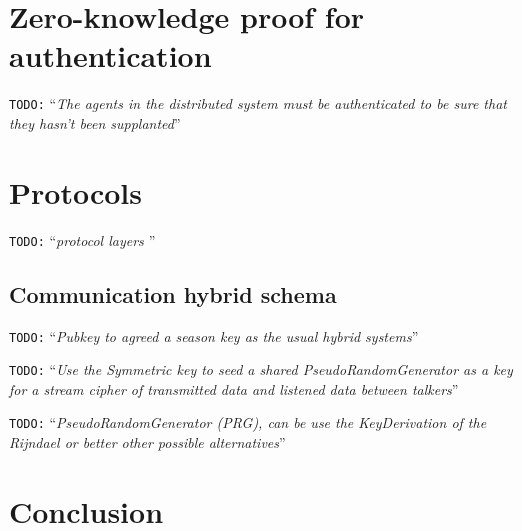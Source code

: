 \documentclass[10pt,a4paper,twoside]{llncs}
\newcommand{\todo}[1]{\texttt{\color{red}TODO:} ``\emph{#1}''}
\begin{document}
%
\section{Zero-knowledge proof for authentication \label{sec:auth}}

\todo{The agents in the distributed system must be authenticated to be sure that they hasn't been supplanted}

%
\section{Protocols}

\todo{protocol layers \cite{Schneier:1995:ACP:572932}}

%
\subsection{Communication hybrid schema \label{sec:intercom}}

\todo{Pubkey to agreed a season key as the usual hybrid systems}

\todo{Use the Symmetric key to seed a shared PseudoRandomGenerator as a key for a stream cipher of transmitted data and listened data between talkers}

\todo{\emph{PseudoRandomGenerator} (PRG), can be use the KeyDerivation of the Rijndael or better other possible alternatives}

%
\section{Conclusion \label{sec:conclusions}}



\end{document}

